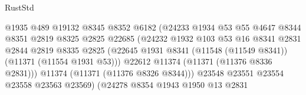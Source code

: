 \begin{lexlean}{RustStd}
\begin{coremodule}
                                          @1935
                                          @489
                                          @19132
                                          @8345
                                          @8352
                                          @6182
                                          (@24233
                                            @1934
                                            @53
                                            @55
                                            @4647
                                            @8344
                                            @8351
                                            @2819
                                            @8325
                                            @2825
                                            @22685
                                            (@24232
                                              @1932
                                              @103
                                              @53
                                              @16
                                              @8341
                                              @2831
                                              @2844
                                              @2819
                                              @8335
                                              @2825
                                              (@22645
                                                @1931
                                                @8341
                                                (@11548 (@11549 @8341))
                                                (@11371 (@11554 @1931 @53)))
                                              @22612
                                              @11374
                                              (@11371 (@11376 @8336 @2831)))
                                            @11374
                                            (@11371 (@11376 @8326 @8344)))
                                          @23548
                                          @23551
                                          @23554
                                          @23558
                                          @23563
                                          @23569)
                                        (@24278
                                          @8354
                                          @1943
                                          @1950
                                          @13
                                          @2831

\end{coremodule}
\end{lexlean}

